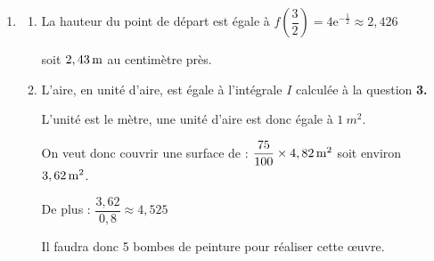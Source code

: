 \documentclass[10pt]{article}
\providecommand{\e}{{\mathrm{e}}}
\providecommand{\np}[2][]{{#2~#1}}
\begin{document}
\begin{enumerate}
\begin{enumerate}
$I \approx 4,821$ soit $4,82$ à $10^{-2}$ près.

	\end{enumerate}

	\item
	\begin{enumerate}
	\item  La hauteur du point de départ est égale à $f\left(\dfrac{3}{2}\right)= 4\e^{-\frac{1}{2}} \approx 2,426$

soit $2,43\,\rm{m}$ au centimètre près.

	\item L'aire, en unité d'aire,  est égale à l'intégrale $I$ calculée à la question \textbf{3.}

L'unité est le mètre, une unité d'aire est donc égale à $\np[m^2]{1}$.

On veut donc couvrir une surface de : \quad $\dfrac{75}{100} \times 4,82 \, \rm{m}^2$ soit environ $3,62 \,\rm{m}^2$.

De plus : $\dfrac{3,62}{0,8} \approx 4,525$

Il faudra donc 5 bombes de peinture pour réaliser cette œuvre.
	\end{enumerate}
\end{enumerate}
\medskip
\end{document}
